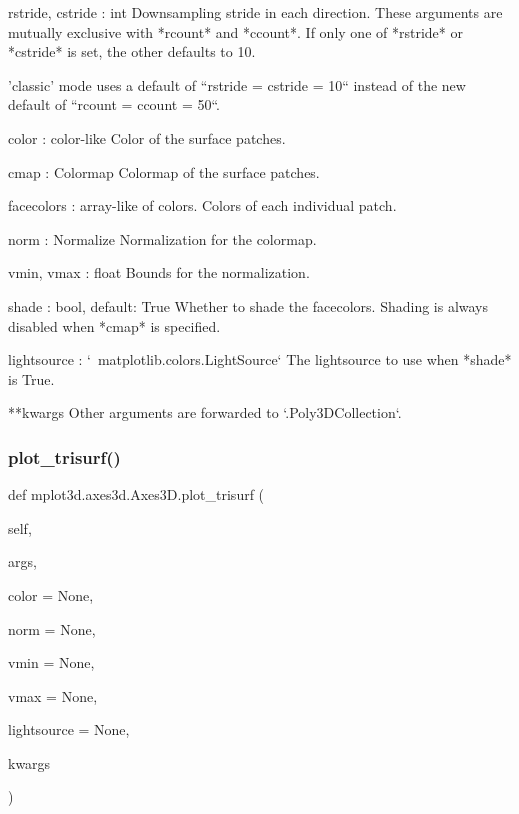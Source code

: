 \begin{DoxyVerb}
\begin{DoxyVerb}
rstride, cstride : int
    Downsampling stride in each direction.  These arguments are
    mutually exclusive with *rcount* and *ccount*.  If only one of
    *rstride* or *cstride* is set, the other defaults to 10.

    'classic' mode uses a default of ``rstride = cstride = 10`` instead
    of the new default of ``rcount = ccount = 50``.

color : color-like
    Color of the surface patches.

cmap : Colormap
    Colormap of the surface patches.

facecolors : array-like of colors.
    Colors of each individual patch.

norm : Normalize
    Normalization for the colormap.

vmin, vmax : float
    Bounds for the normalization.

shade : bool, default: True
    Whether to shade the facecolors.  Shading is always disabled when
    *cmap* is specified.

lightsource : `~matplotlib.colors.LightSource`
    The lightsource to use when *shade* is True.

**kwargs
    Other arguments are forwarded to `.Poly3DCollection`.
\end{DoxyVerb}
 \mbox{\label{classmplot3d_1_1axes3d_1_1Axes3D_a80f6004338703041b0e59bbe43eb8cee}} 
\subsubsection{\texorpdfstring{plot\+\_\+trisurf()}{plot\_trisurf()}}
{\footnotesize\ttfamily def mplot3d.\+axes3d.\+Axes3\+D.\+plot\+\_\+trisurf (\begin{DoxyParamCaption}\item[{}]{self,  }\item[{}]{args,  }\item[{}]{color = {\ttfamily None},  }\item[{}]{norm = {\ttfamily None},  }\item[{}]{vmin = {\ttfamily None},  }\item[{}]{vmax = {\ttfamily None},  }\item[{}]{lightsource = {\ttfamily None},  }\item[{}]{kwargs }\end{DoxyParamCaption})}


\end{DoxyVerb}
